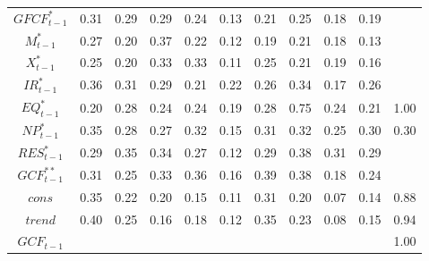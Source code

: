 \documentclass[a4paper, twoside]{templates/ociamthesis}
\begin{document}
\begin{table}[!ht]
\begin{tabular}[t]{ccccccccccc}
$GFCF^*_{t-1}$ & 0.31 & 0.29 & 0.29 & 0.24 & 0.13 & 0.21 & 0.25 & 0.18 & 0.19 & \\
$M^*_{t-1}$ & 0.27 & 0.20 & 0.37 & 0.22 & 0.12 & 0.19 & 0.21 & 0.18 & 0.13 & \\
$X^*_{t-1}$ & 0.25 & 0.20 & 0.33 & 0.33 & 0.11 & 0.25 & 0.21 & 0.19 & 0.16 & \\
$IR^*_{t-1}$ & 0.36 & 0.31 & 0.29 & 0.21 & 0.22 & 0.26 & 0.34 & 0.17 & 0.26 & \\
$EQ^*_{t-1}$ & 0.20 & 0.28 & 0.24 & 0.24 & 0.19 & 0.28 & 0.75 & 0.24 & 0.21 & 1.00\\
$NP^*_{t-1}$ & 0.35 & 0.28 & 0.27 & 0.32 & 0.15 & 0.31 & 0.32 & 0.25 & 0.30 & 0.30\\
$RES^*_{t-1}$ & 0.29 & 0.35 & 0.34 & 0.27 & 0.12 & 0.29 & 0.38 & 0.31 & 0.29 & \\
$GCF^{**}_{t-1}$ & 0.31 & 0.25 & 0.33 & 0.36 & 0.16 & 0.39 & 0.38 & 0.18 & 0.24 & \\
$cons$ & 0.35 & 0.22 & 0.20 & 0.15 & 0.11 & 0.31 & 0.20 & 0.07 & 0.14 & 0.88\\
$trend$ & 0.40 & 0.25 & 0.16 & 0.18 & 0.12 & 0.35 & 0.23 & 0.08 & 0.15 & 0.94\\
$GCF_{t-1}$ &  &  &  &  &  &  &  &  &  & 1.00\\
\bottomrule
\end{tabular}
\end{table}

\clearpage
\end{document}
